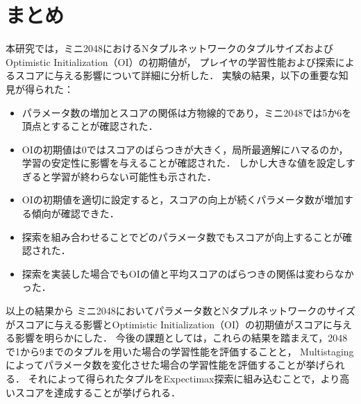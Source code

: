 \newpage
\section{まとめ}
本研究では，ミニ2048におけるNタプルネットワークのタプルサイズおよびOptimistic Initialization（OI）の初期値が，
プレイヤの学習性能および探索によるスコアに与える影響について詳細に分析した．
実験の結果，以下の重要な知見が得られた：
\begin{itemize}
\item パラメータ数の増加とスコアの関係は方物線的であり，ミニ2048では5か6を頂点とすることが確認された．
\item OIの初期値は0ではスコアのばらつきが大きく，局所最適解にハマるのか，学習の安定性に影響を与えることが確認された．
しかし大きな値を設定しすぎると学習が終わらない可能性も示された．
\item OIの初期値を適切に設定すると，スコアの向上が続くパラメータ数が増加する傾向が確認できた．
\item 探索を組み合わせることでどのパラメータ数でもスコアが向上することが確認された．
\item 探索を実装した場合でもOIの値と平均スコアのばらつきの関係は変わらなかった．
\end{itemize}

以上の結果から
ミニ2048においてパラメータ数とNタプルネットワークのサイズがスコアに与える影響とOptimistic Initialization（OI）の初期値がスコアに与える影響を明らかにした．
今後の課題としては，これらの結果を踏まえて，2048で1から9までのタプルを用いた場合の学習性能を評価することと，
Multistagingによってパラメータ数を変化させた場合の学習性能を評価することが挙げられる．
それによって得られたタプルをExpectimax探索に組み込むことで，より高いスコアを達成することが挙げられる．

